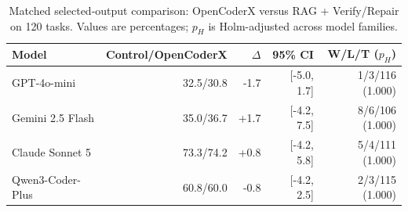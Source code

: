 \begin{table}[t]
\centering
\small
\caption{Matched selected-output comparison: OpenCoderX versus RAG + Verify/Repair on 120 tasks. Values are percentages; $p_H$ is Holm-adjusted across model families.}
\label{tab:matched_baseline_final}
\begin{tabular}{lrrrr}
\toprule
Model & Control/OpenCoderX & $\Delta$ & 95\% CI & W/L/T ($p_H$) \\
\midrule
GPT-4o-mini & 32.5/30.8 & -1.7 & [-5.0, 1.7] & 1/3/116 (1.000) \\
Gemini 2.5 Flash & 35.0/36.7 & +1.7 & [-4.2, 7.5] & 8/6/106 (1.000) \\
Claude Sonnet 5 & 73.3/74.2 & +0.8 & [-4.2, 5.8] & 5/4/111 (1.000) \\
Qwen3-Coder-Plus & 60.8/60.0 & -0.8 & [-4.2, 2.5] & 2/3/115 (1.000) \\
\bottomrule
\end{tabular}
\end{table}
